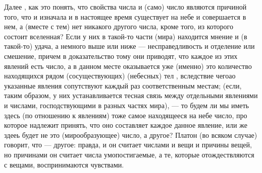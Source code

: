 \documentclass{article}
\begin{document}
Далее , как это понять, что свойства числа и (само) число являются причиной того, что и изначала и в настоящее время существует на небе и совершается в нем, а (вместе с тем) нет никакого другого числа, кроме того, из которого состоит вселенная? Если у них в такой-то части (мира) находится мнение и (в такой-то) удача, а немного выше или ниже --- несправедливость и отделение или смешение, причем в доказательство тому они приводят, что каждое из этих явлений есть число, а в данном месте оказывается уже (именно) это количество находящихся рядом (сосуществующих) (небесных) тел , вследствие чегоао указанные явления сопутствуют каждый раз соответственным местам; (если, таким образом, у них устанавливается тесная связь между отдельными явлениями и числами, господствующими в разных частях мира), --- то будем ли мы иметь здесь (по отношению к явлениям) тоже самое находящееся на небе число, про которое надлежит принять, что оно составляет каждое данное явление, или же здееь будет не это (мирообразующее) число, а другое? Платон (во всяком случае) говорит, что --- другое: правда, и он считает числами и вещи и причины вещей, но причинами он считает числа умопостигаемые, а те, которые отождествляются с вещами, воспринимаются чувствами.
\end{document}
